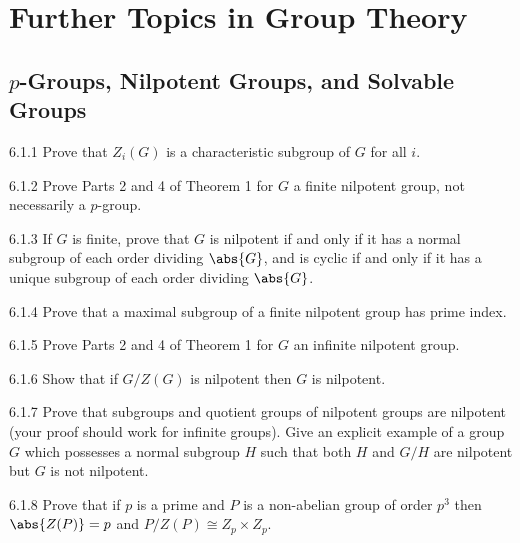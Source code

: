 \section{Further Topics in Group Theory}

\subsection{$p$-Groups, Nilpotent Groups, and Solvable Groups}

\begin{exercise}{6.1.1}
    Prove that $Z_i(G)$ is a characteristic subgroup of $G$ for all $i$.
\end{exercise}

\begin{exercise}{6.1.2}
    Prove Parts 2 and 4 of Theorem 1 for $G$ a finite nilpotent group, not necessarily a $p$-group.
\end{exercise}

\begin{exercise}{6.1.3}
    If $G$ is finite, prove that $G$ is nilpotent if and only if it has a normal subgroup of each order dividing $\abs{G}$, and is cyclic if and only if it has a unique subgroup of each order dividing $\abs{G}$.
\end{exercise}

\begin{exercise}{6.1.4}
    Prove that a maximal subgroup of a finite nilpotent group has prime index.
\end{exercise}

\begin{exercise}{6.1.5}
    Prove Parts 2 and 4 of Theorem 1 for $G$ an infinite nilpotent group.
\end{exercise}

\begin{exercise}{6.1.6}
    Show that if $G/Z(G)$ is nilpotent then $G$ is nilpotent.
\end{exercise}

\begin{exercise}{6.1.7}
    Prove that subgroups and quotient groups of nilpotent groups are nilpotent (your proof should work for infinite groups).
    Give an explicit example of a group $G$ which possesses a normal subgroup $H$ such that both $H$ and $G/H$ are nilpotent but $G$ is not nilpotent.
\end{exercise}

\begin{exercise}{6.1.8}
    Prove that if $p$ is a prime and $P$ is a non-abelian group of order $p^3$ then $\abs{Z(P)} = p$ and $P/Z(P) \cong Z_p \times Z_p$.
\end{exercise}

